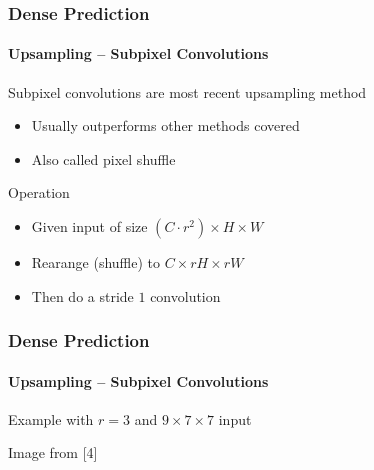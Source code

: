 \documentclass[xetex,professionalfont]{beamer}
\renewcommand\emph[1]{\textcolor{tuwcvl_cvl_blue}{#1}}
\begin{document}
\begin{frame}
	\frametitle{Dense Prediction}
	\framesubtitle{Upsampling -- Subpixel Convolutions}

	\emph{Subpixel convolutions} are most recent upsampling method
	\begin{itemize}
		\item Usually outperforms other methods covered
		\item Also called \emph{pixel shuffle}
	\end{itemize}

	\bigskip

	Operation
	\begin{itemize}
		\item Given input of size $(C\cdot r^2)\times H\times W$ %
		\item Rearange (shuffle) to $C\times rH\times rW$
		\item Then do a stride $1$ convolution
	\end{itemize}

\end{frame}


\begin{frame}
	\frametitle{Dense Prediction}
	\framesubtitle{Upsampling -- Subpixel Convolutions}

	Example with $r=3$ and $9\times7\times7$ input


	\bigskip

	\begin{center}
		{\centering Image from [4]}
	\end{center}

\end{frame}
\end{document}
